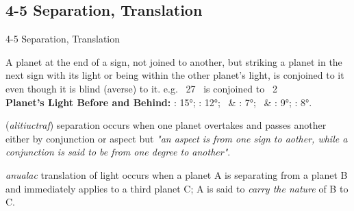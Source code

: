 \subsection{4-5 Separation, Translation}
\begin{frame}[t]{4-5 Separation, Translation}
\begin{description}[style=nextline]
\item[3. Connection Cont'd] A planet at the end of a sign, not joined to another, but striking a planet in the next sign with its light or being within the other planet's light, is conjoined to it even though it is blind (averse) to it\footnotemark[1]. e.g. \Moon\ 27 \Aries\ is conjoined to \Venus\ 2 \Taurus \\
\vspace{1em}
\textbf{Planet's Light Before and Behind:} \Sun: 15°; \Moon: 12°; \Venus\ \& \Mercury: 7°; \Jupiter\ \& \Saturn: 9°; \Mars: 8°. \\

\item[4. Separation] (\textsl{alitiuctraf}) separation occurs when one planet overtakes and passes another either by conjunction or aspect but \textsl{"an aspect is from one sign to aother, while a conjunction is said to be from one degree to another"}. \\

\item[5. Translation] \textsl{anualac} translation of light occurs when a planet A is separating from a planet B and immediately applies to a third planet C; A is said to \textsl{carry the nature} of B to C. 
\end{description}

\end{frame}

